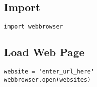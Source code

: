 \subsection{Import}
\begin{lstlisting}
import webbrowser
\end{lstlisting}

\subsection{Load Web Page}
\begin{lstlisting}
website = 'enter_url_here'
webbrowser.open(websites)
\end{lstlisting}

